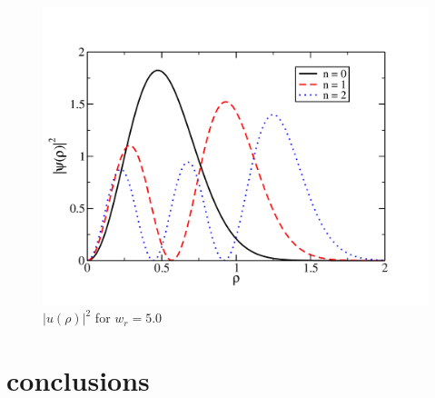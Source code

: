 \documentclass[prc,amsmath,twocolumn,superscriptaddress]{revtex4}
\begin{document}
\begin{figure}[b]
\includegraphics[scale=0.33]{wf_5.pdf}
\caption{$|u(\rho)|^2$ for $w_r = 5.0$}
\label{algorithm}
\end{figure}


\section{conclusions}
\label{conc}


\end{document}
